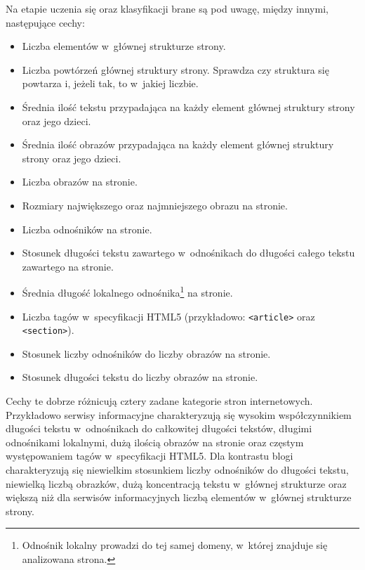 \documentclass[a4paper,11pt]{article}
\begin{document}
Na etapie uczenia się oraz klasyfikacji brane są pod uwagę, między innymi, następujące cechy:

\begin{itemize}
    \item Liczba elementów w~głównej strukturze strony.
    \item Liczba powtórzeń głównej struktury strony. Sprawdza czy struktura się powtarza i, jeżeli tak, to w~jakiej liczbie.
    \item Średnia ilość tekstu przypadająca na każdy element głównej struktury strony oraz jego dzieci. 
    \item Średnia ilość obrazów przypadająca na każdy element głównej struktury strony oraz jego dzieci.
    \item Liczba obrazów na stronie.
    \item Rozmiary największego oraz najmniejszego obrazu na stronie.
    \item Liczba odnośników na stronie.
    \item Stosunek długości tekstu zawartego w~odnośnikach do długości całego tekstu zawartego na stronie.
    \item Średnia długość lokalnego odnośnika\footnote{Odnośnik lokalny prowadzi do tej samej domeny, w~której znajduje się analizowana strona.} na stronie.
    \item Liczba tagów w~specyfikacji HTML5 (przykładowo: \verb+<article>+ oraz \verb+<section>+).
    \item Stosunek liczby odnośników do liczby obrazów na stronie.
    \item Stosunek długości tekstu do liczby obrazów na stronie.
\end{itemize}

Cechy te dobrze różnicują cztery zadane kategorie stron internetowych. Przykładowo serwisy informacyjne charakteryzują się wysokim współczynnikiem długości tekstu w~odnośnikach do całkowitej długości tekstów, długimi odnośnikami lokalnymi, dużą ilością obrazów na stronie oraz częstym występowaniem tagów w~specyfikacji HTML5. Dla kontrastu blogi charakteryzują się niewielkim stosunkiem liczby odnośników do długości tekstu, niewielką liczbą obrazków, dużą koncentracją tekstu w~głównej strukturze oraz większą niż dla serwisów informacyjnych liczbą elementów w~głównej strukturze strony.
\end{document}
